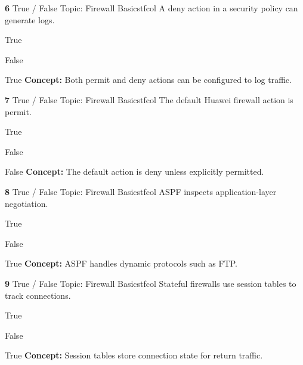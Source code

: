 \documentclass[10pt,a4paper]{article}
\begin{document}
\begin{qcard}{\color{white}\textbf{6} \hfill \small True / False \textbar{} Topic: Firewall Basics}{tfcol}
A deny action in a security policy can generate logs.

\begin{qoptions}
\item True
\item False
\end{qoptions}
\begin{explainbox}{True}
\textbf{Concept:} Both permit and deny actions can be configured to log traffic.
\end{explainbox}
\end{qcard}

\begin{qcard}{\color{white}\textbf{7} \hfill \small True / False \textbar{} Topic: Firewall Basics}{tfcol}
The default Huawei firewall action is permit.

\begin{qoptions}
\item True
\item False
\end{qoptions}
\begin{explainbox}{False}
\textbf{Concept:} The default action is deny unless explicitly permitted.
\end{explainbox}
\end{qcard}

\begin{qcard}{\color{white}\textbf{8} \hfill \small True / False \textbar{} Topic: Firewall Basics}{tfcol}
ASPF inspects application-layer negotiation.

\begin{qoptions}
\item True
\item False
\end{qoptions}
\begin{explainbox}{True}
\textbf{Concept:} ASPF handles dynamic protocols such as FTP.
\end{explainbox}
\end{qcard}

\begin{qcard}{\color{white}\textbf{9} \hfill \small True / False \textbar{} Topic: Firewall Basics}{tfcol}
Stateful firewalls use session tables to track connections.

\begin{qoptions}
\item True
\item False
\end{qoptions}
\begin{explainbox}{True}
\textbf{Concept:} Session tables store connection state for return traffic.
\end{explainbox}
\end{qcard}
\end{document}
